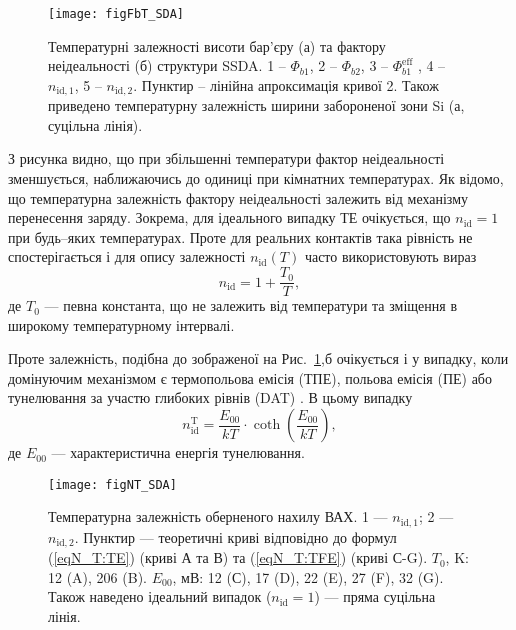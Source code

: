 

\begin{figure}
\center
\texttt{[image: figFbT\_SDA]}
\caption{\label{figFbT_SDA}
Температурні залежності висоти бар'єру (а) та фактору неідеальності (б) структури SSDA.
1 -- $\Phi_{b1}$,
2 -- $\Phi_{b2}$,
3 -- $\Phi_{b1}^\mathrm{eff}$ ,
4 -- $n_{\mathrm{id},1}$, 5 -- $n_{\mathrm{id},2}$.
Пунктир -- лінійна апроксимація кривої 2.
Також приведено температурну залежність ширини забороненої зони Si (а, суцільна лінія).
}%
\end{figure}

З рисунка видно, що при збільшенні температури фактор неідеальності зменшується, наближаючись
до одиниці при кімнатних температурах.
Як відомо, що температурна залежність фактору неідеальності залежить від механізму перенесення заряду.
Зокрема, для ідеального випадку ТЕ очікується, що $n_{\mathrm{id}}=1$ при будь--яких температурах.
Проте для реальних контактів така рівність не спостерігається і для опису залежності $n_{\mathrm{id}}(T)$
часто використовують вираз \cite{Rhoderick1988, Sze2012}
\begin{equation}\label{eqN_T:TE}
n_{\mathrm{id}}=1+\frac{T_0}{T},
\end{equation}
де $T_0$ --- певна константа, що не залежить від температури та зміщення в широкому температурному інтервалі.

Проте залежність, подібна до зображеної на Рис.~\ref{figFbT_SDA},б очікується
і у випадку, коли домінуючим механізмом є термопольова  емісія (ТПЕ), польова емісія (ПЕ) або тунелювання за участю глибоких рівнів (DAT)
\cite{Rhoderick1988,Evstropov,Soylu,JYOTHI2015,OZAVCI2013,Abhishek}.
В цьому випадку
\begin{equation}\label{eqN_T:TFE}
n_{\mathrm{id}}^\mathrm{T}=\frac{E_{00}}{kT}\cdot\coth\left(\frac{E_{00}}{kT}\right),
\end{equation}
де $E_{00}$ --- характеристична енергія тунелювання.


\begin{figure}
\center
\texttt{[image: figNT\_SDA]}
\caption{\label{figNT_SDA}
Температурна залежність оберненого нахилу ВАХ.
1 --- $n_{\mathrm{id},1}$;
2 --- $n_{\mathrm{id},2}$.
Пунктир --- теоретичні криві відповідно до формул (\ref{eqN_T:TE}) (криві А та В)
та (\ref{eqN_T:TFE}) (криві С-G).
$T_0$, K: 12 (A), 206 (B).
$E_{00}$, мВ: 12 (С), 17 (D), 22 (E), 27 (F), 32 (G).
Також наведено ідеальний випадок ($n_{\mathrm{id}}=1$) --- пряма суцільна лінія.
}%
\end{figure}


